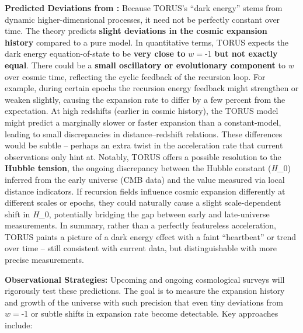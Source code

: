\documentclass[
]{article}
\begin{document}
{\textbf{Predicted Deviations from \LambdaCDM:} Because TORUS's ``dark energy''
stems from dynamic higher-dimensional processes, it need not be
perfectly constant over time. The theory predicts \textbf{slight
deviations in the cosmic expansion history} compared to a pure \LambdaCDM
model. In quantitative terms, TORUS expects the dark energy
equation-of-state to be \textbf{very close to} $w =$-1 \textbf{but
not exactly equal}\hspace{0pt}. There could be a \textbf{small
oscillatory or evolutionary component} to \emph{w} over cosmic time,
reflecting the cyclic feedback of the recursion loop\hspace{0pt}. For
example, during certain epochs the recursion energy feedback might
strengthen or weaken slightly, causing the expansion rate to differ by a
few percent from the \LambdaCDM expectation. At high redshifts (earlier in
cosmic history), the TORUS model might predict a marginally slower or
faster expansion than a constant-\Lambda model, leading to small discrepancies
in distance--redshift relations\hspace{0pt}. These differences would be
subtle -- perhaps an extra twist in the acceleration rate that current
observations only hint at. Notably, TORUS offers a possible resolution
to the \textbf{Hubble tension}\hspace{0pt}, the ongoing discrepancy
between the Hubble constant
(\emph{H}_{0}) inferred
from the early universe (CMB data) and the value measured via local
distance indicators. If recursion fields influence cosmic expansion
differently at different scales or epochs, they could naturally cause a
slight scale-dependent shift in
\emph{H}_{0}\hspace{0pt},
potentially bridging the gap between early and late-universe
measurements. In summary, rather than a perfectly featureless
acceleration, TORUS paints a picture of a dark energy effect with a
faint ``heartbeat'' or trend over time -- still consistent with current
data, but distinguishable with more precise measurements.

\textbf{Observational Strategies:} Upcoming and ongoing cosmological
surveys will rigorously test these predictions. The goal is to measure
the expansion history and growth of the universe with such precision
that even tiny deviations from $w =$-1 or subtle shifts in
expansion rate become detectable. Key approaches include:

}
\end{document}
